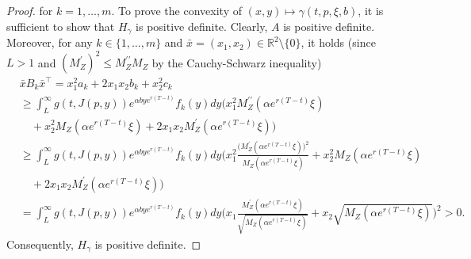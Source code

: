 \documentclass[10pt,a4paper]{amsart}
\newcommand{\R}{\mathbb{R}}
\begin{document}
\begin{proof}
for $k=1,\ldots,m$. To prove the convexity of $(x,y)\mapsto \gamma(t,p,\xi,b)$, it is sufficient to show that $H_\gamma$ is positive definite. Clearly, $A$ is positive definite. Moreover, for any $k\in\{1,\ldots,m\}$ and $\bar{x}=(x_1,x_2)\in\R^2\setminus\{0\}$, it holds (since $L>1$ and $(M_Z^\prime)^2 \le M_Z^{\prime\prime} M_Z$ by the Cauchy-Schwarz inequality)
\begin{align*}
&\bar{x} B_k \bar{x}^\top = x_1^2 a_k + 2x_1x_2b_k + x_2^2c_k \\
 &\ge \int_L^\infty \!g(t,J(p,y))e^{\alpha b y e^{r(T-t)}}f_k(y)dy\Big(x_1^2 M_Z^{\prime\prime}(\alpha e^{r(T-t)}\xi) \\
 &\quad + x_2^2 M_Z(\alpha e^{r(T-t)}\xi) + 2x_1x_2 M_Z^\prime(\alpha e^{r(T-t)}\xi)\Big) \\
&\ge \int_L^\infty \!g(t,J(p,y))e^{\alpha b y e^{r(T-t)}}f_k(y)dy\bigg(x_1^2 \frac{\big(M_Z^{\prime}(\alpha e^{r(T-t)}\xi)\big)^2}{M_Z(\alpha e^{r(T-t)}\xi)} + x_2^2 M_Z(\alpha e^{r(T-t)}\xi) \\
&\quad + 2x_1x_2 M_Z^\prime(\alpha e^{r(T-t)}\xi)\bigg) \\
&= \int_L^\infty \!g(t,J(p,y))e^{\alpha b y e^{r(T-t)}}f_k(y)dy \bigg(x_1 \frac{M_Z^{\prime}(\alpha e^{r(T-t)}\xi)}{\sqrt{M_Z(\alpha e^{r(T-t)}\xi)}} + x_2\sqrt{M_Z(\alpha e^{r(T-t)}\xi)}\bigg)^2>0.
\end{align*}
Consequently, $H_\gamma$ is positive definite.
\end{proof}
\end{document}

